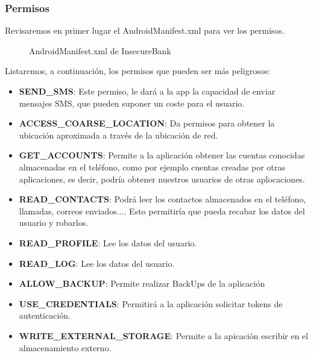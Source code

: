\documentclass[12pt,twoside]{article}
\begin{document}
\subsubsection{Permisos}
Revisaremos en primer lugar el AndroidManifest.xml para ver los permisos.
\begin{figure}[H]
    \centering
    \caption{AndroidManifest.xml de InsecureBank}
\end{figure}
Listaremos, a continuación, los permisos que pueden ser más peligrosos:
\begin{itemize}
    \item \textbf{SEND\_SMS}: Este permiso, le dará a la app la capacidad de enviar mensajes SMS, que pueden suponer un coste para el usuario.
    \item \textbf{ACCESS\_COARSE\_LOCATION}: Da permisos para obtener la ubicación aproximada a través de la ubicación de  red. 
    \item \textbf{GET\_ACCOUNTS}: Permite a la aplicación obtener las cuentas conocidas almacenadas en el teléfono, como por ejemplo cuentas creadas por otras aplicaciones, es decir, podría obtener nuestros usuarios de otras aplocaciones.
    \item \textbf{READ\_CONTACTS}: Podrá leer los contactos almacenados en el teléfono, llamadas, correos enviados.... Esto permitiría que pueda recabar los datos del usuario y robarlos.
    \item \textbf{READ\_PROFILE}: Lee los datos del usuario. 
    \item \textbf{READ\_LOG}: Lee los datos del usuario.
    \item \textbf{ALLOW\_BACKUP}: Permite realizar BackUps de la aplicación
    \item \textbf{USE\_CREDENTIALS}: Permitirá a la aplicación solicitar tokens de autenticación. 
    \item \textbf{WRITE\_EXTERNAL\_STORAGE}: Permite a la apicación escribir en el almacenamiento externo.
\end{itemize}
\end{document}

